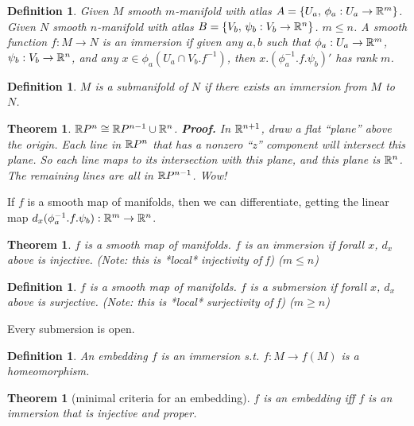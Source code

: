 \documentclass[11pt,leqno,oneside]{amsart}
\newcommand{\de}{\emph}
\theoremstyle{mystyle} \newtheorem{thrm}[thm]{Theorem}
\theoremstyle{mystyle} \newtheorem{defi}[thm]{Definition}
\begin{document}
\begin{defi}
	Given $M$ smooth $m$-manifold with atlas $A = \{ U_a, \,\phi_a : U_a \to {\mathbb R}^m \}$.
	Given $N$ smooth $n$-manifold with atlas $B = \{ V_b, \,\psi_b : V_b \to {\mathbb R}^n \}$.
	$m \leq n$.
	A smooth function $f : M \to N$  is an \de{immersion} if given any $a, b$ such that $\phi_a: U_a \to {\mathbb R}^m$, $\psi_b: V_b \to {\mathbb R}^n$, and any $x \in \phi_a(U_a \cap V_b.f^{-1})$, then $x.(\phi_a^{-1}.f.\psi_b)'$ has rank $m$.
\end{defi}

\begin{defi}
	$M$ is a \de{submanifold} of $N$ if there exists an immersion from $M$ to $N$.
\end{defi}

\begin{thrm}
	${\mathbb R} P^n \mathrel{\cong} {\mathbb R} P^{n-1} \cup {\mathbb R}^n$.
	\textbf{Proof.}  In ${\mathbb R}^{n+1}$, draw a flat ``plane'' above the origin.  Each line in ${\mathbb R} P^n$ that has a nonzero ``z'' component will intersect this plane.  So each line maps to its intersection with this plane, and this plane is ${\mathbb R}^n$.  The remaining lines are all in ${\mathbb R} P^{n-1}$.  Wow!
\end{thrm}



If $f$ is a smooth map of manifolds, then we can differentiate, getting the linear map $d_x(\phi_a^{-1}.f.\psi_b): {\mathbb R}^m \to {\mathbb R}^n$.

\begin{thrm}
	$f$ is a smooth map of manifolds.
	$f$ is an \de{immersion} if forall $x$, $d_x$ above is injective.  (Note: this is *local* injectivity of f) ($m \leq n$)
\end{thrm}

\begin{defi}
	$f$ is a smooth map of manifolds.
	$f$ is a \de{submersion} if forall $x$, $d_x$ above is surjective.  (Note: this is *local* surjectivity of f) ($m \geq n$)
\end{defi}
\begin{prop}
	Every submersion is open.
\end{prop}

\begin{defi}
	An \de{embedding} $f$ is an immersion s.t. $f : M \to f(M)$ is a homeomorphism.
\end{defi}
\begin{thrm}[minimal criteria for an embedding]
	$f$ is an \de{embedding} iff $f$ is an immersion that is injective and proper.
\end{thrm}
\end{document}
